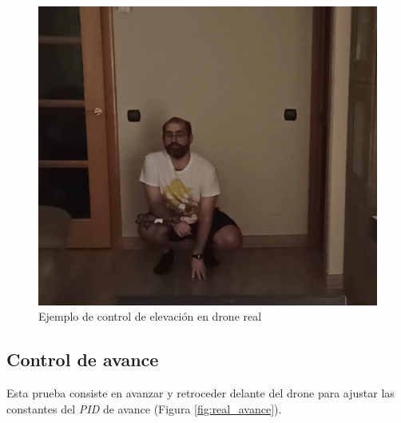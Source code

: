 \begin{figure}[!htb]
\endminipage\hfill
{}
    \includegraphics[width=\linewidth]{figures/real/elevacion_3.png}
\endminipage\hfill
\caption{Ejemplo de control de elevación en drone real}
\label{fig:real_elev}
\end{figure}
\subsection{Control de avance}
Esta prueba consiste en avanzar y retroceder delante del drone para ajustar las constantes del \textit{PID} de avance (Figura \ref{fig:real_avance}).

